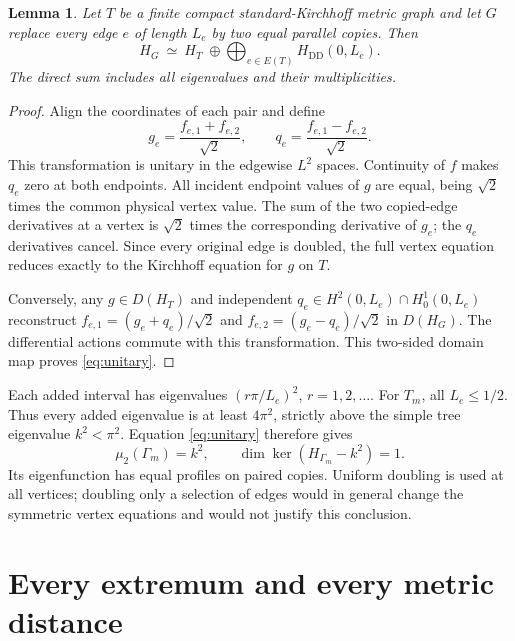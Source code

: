\documentclass[11pt]{article}
\numberwithin{equation}{section}
\newtheorem{lemma}{Lemma}
\theoremstyle{remark}
\newcommand{\T}{T_m}
\newcommand{\G}{\Gamma_m}
\newcommand{\HDD}{H_{\mathrm{DD}}}
\begin{document}
\begin{lemma}\label{lem:doubling}
Let \(T\) be a finite compact standard-Kirchhoff metric graph and
let \(G\) replace every edge \(e\) of length \(L_e\) by two equal
parallel copies. Then
\begin{equation}\label{eq:unitary}
  H_G\ \simeq\ H_T\;\oplus\!
  \bigoplus_{e\in E(T)}\HDD(0,L_e).
\end{equation}
The direct sum includes all eigenvalues and their multiplicities.
\end{lemma}

\begin{proof}
Align the coordinates of each pair and define
\[
  g_e=\frac{f_{e,1}+f_{e,2}}{\sqrt2},\qquad
  q_e=\frac{f_{e,1}-f_{e,2}}{\sqrt2}.
\]
This transformation is unitary in the edgewise \(L^2\) spaces.
Continuity of \(f\) makes \(q_e\) zero at both endpoints.
All incident endpoint values of \(g\) are equal, being \(\sqrt2\)
times the common physical vertex value.
The sum of the two copied-edge derivatives at a vertex is
\(\sqrt2\) times the corresponding derivative of \(g_e\); the
\(q_e\) derivatives cancel. Since every original edge is doubled,
the full vertex equation reduces exactly to the Kirchhoff equation
for \(g\) on \(T\).

Conversely, any \(g\in D(H_T)\) and independent
\(q_e\in H^2(0,L_e)\cap H^1_0(0,L_e)\) reconstruct
\(f_{e,1}=(g_e+q_e)/\sqrt2\) and
\(f_{e,2}=(g_e-q_e)/\sqrt2\) in \(D(H_G)\).
The differential actions commute with this transformation.
This two-sided domain map proves \eqref{eq:unitary}.
\end{proof}

Each added interval has eigenvalues \((r\pi/L_e)^2\),
\(r=1,2,\ldots\). For \(\T\), all \(L_e\leq1/2\).
Thus every added eigenvalue is at least \(4\pi^2\), strictly above
the simple tree eigenvalue \(k^2<\pi^2\). Equation
\eqref{eq:unitary} therefore gives
\begin{equation}\label{eq:doubled-eigenvalue}
  \mu_2(\G)=k^2,\qquad
  \dim\ker(H_{\G}-k^2)=1.
\end{equation}
Its eigenfunction has equal profiles on paired copies.
Uniform doubling is used at all vertices; doubling only a selection
of edges would in general change the symmetric vertex equations
and would not justify this conclusion.

\section{Every extremum and every metric distance}\label{sec:extrema}
\end{document}

